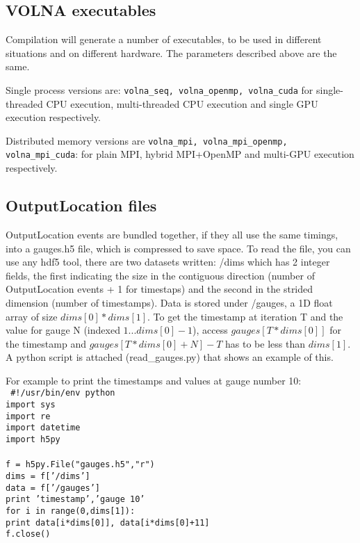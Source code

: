 \documentclass[11pt]{article}
\begin{document}
\subsection{VOLNA executables}
Compilation will generate a number of executables, to be used in different situations and on different hardware. The parameters described above are the same.

Single process versions are: \texttt{volna\_seq, volna\_openmp, volna\_cuda} for single-threaded CPU execution, multi-threaded CPU execution and single GPU execution respectively.

Distributed memory versions are \texttt{volna\_mpi, volna\_mpi\_openmp, volna\_mpi\_cuda}: for plain MPI, hybrid MPI+OpenMP and multi-GPU execution respectively.


\subsection{OutputLocation files}\label{sec/location}

OutputLocation events are bundled together, if they all use the same timings, into a gauges.h5 file, which is compressed to save space. To read the file, you can use any hdf5 tool, there are two datasets written: /dims which has 2 integer fields, the first indicating the size in the contiguous direction (number of OutputLocation events + 1 for timestaps) and the second in the strided dimension (number of timestamps). Data is stored under /gauges, a 1D float array of size $dims[0]*dims[1]$. To get the timestamp at iteration T and the value for gauge N (indexed $1...dims[0]-1$), access $gauges[T*dims[0]]$ for the timestamp and $gauges[T*dims[0]+N] - T$ has to be less than $dims[1]$. A python script is attached (read\_gauges.py) that shows an example of this.

For example to print the timestamps and values at gauge number 10: \\
{\tt
\#!/usr/bin/env python \\
import sys \\
import re \\
import datetime \\
import h5py \\
 \\
f = h5py.File("gauges.h5","r") \\
dims = f['/dims'] \\
data = f['/gauges'] \\
print 'timestamp','gauge 10'\\
for i in range(0,dims[1]): \\
print data[i*dims[0]], data[i*dims[0]+11] \\
f.close() \\
}
\end{document}
